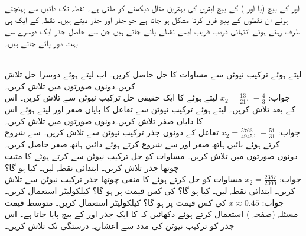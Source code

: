  اور  کے بیچ (یا  اور 
) کے بیچ ابتری کی بہترین مثال دیکھنے کو ملتی ہے۔ نقطہ  تک دائیں سے پہنچتے ہوئے ان نقطوں کے بیچ فرق کرنا مشکل ہو جاتا ہے جو جذر  اور جذر  دیتے ہیں۔ نقطہ  کے ایک ہی طرف رہتے ہوئے  انتہائی قریب قریب ایسے نقطے پائے جاتے ہیں جن سے حاصل جذر ایک دوسرے سے بہت دور پائے جاتے ہیں۔



\\
 لیتے ہوئے ترکیب نیوٹن سے مساوات  کا حل حاصل کریں۔  اب  لیتے ہوئے دوسرا حل تلاش کریں۔دونوں صورتوں میں  تلاش کریں۔\\
جواب:\quad
$x_2=\tfrac{13}{21},\, -\tfrac{4}{3}$
 لیتے ہوئے  کا ایک حقیقی حل ترکیب نیوٹن سے تلاش کریں۔ اس کے بعد  تلاش کریں۔
 لیتے ہوئے ترکیب نیوٹن سے  تفاعل  کا بایاں صفر اور  لیتے ہوئے اس کا دایاں صفر تلاش کریں۔دونوں صورتوں میں  تلاش کریں۔\\
جواب:\quad
$x_2=\tfrac{5763}{4945},\, -\tfrac{51}{31}$
تفاعل  کے دونوں جذر ترکیب نیوٹن سے تلاش کریں۔  سے شروع کرتے ہوئے بائیں ہاتھ صفر اور سے شروع  کرتے ہوئے دائیں ہاتھ صفر حاصل کریں۔ دونوں صورتوں میں  تلاش کریں۔
مساوات  کو حل ترکیب نیوٹن سے  کرتے ہوئے  کا مثبت چوتھا جذر تلاش کریں۔ ابتدائی نقطہ  لیں۔ کیا ہو گا؟\\
جواب:\quad
$x_2=\tfrac{2387}{2000}$
مساوات  کو حل کرتے ہوئے  کا منفی چوتھا جذر ترکیب نیوٹن سے  تلاش کریں۔ ابتدائی نقطہ  لیں۔ کیا ہو گا؟
 کی کس قیمت پر  ہو گا؟ کیلکولیٹر استعمال کریں۔\\
جواب:\quad
$x\approx 0.45$
 کی کس قیمت پر  ہو گا؟ کیلکولیٹر استعمال کریں۔
متوسط قیمت مسئلہ (صفحہ ) استعمال کرتے ہوئے دکھائیں کہ  کا ایک جذر  اور  کے بیچ پایا جاتا ہے۔ اس جذر کو ترکیب نیوٹن کی مدد سے  اعشاریہ درستگی تک تلاش کریں۔\\
